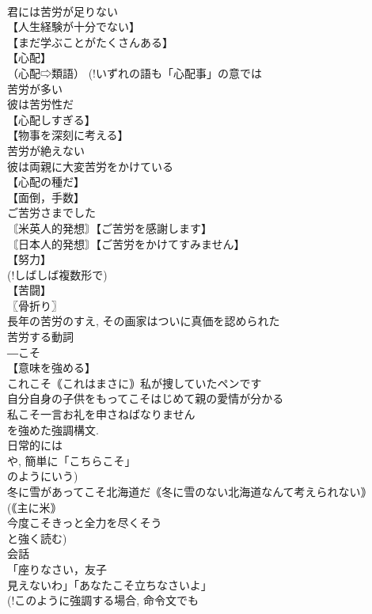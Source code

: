 \documentclass[8pt]{extreport}
\begin{document}
\begin{CJK}{UTF8}{min}
\\	君には苦労が足りない
\\	【人生経験が十分でない】
\\	【まだ学ぶことがたくさんある】
\\	【心配】
\\	（心配⇨類語） (!いずれの語も「心配事」の意では 
\\	苦労が多い
\\	彼は苦労性だ
\\	【心配しすぎる】
\\	【物事を深刻に考える】
\\	苦労が絶えない
\\	彼は両親に大変苦労をかけている
\\	【心配の種だ】
\\	【面倒，手数】
\\	ご苦労さまでした
\\	〘米英人的発想〙【ご苦労を感謝します】
\\	〘日本人的発想〙【ご苦労をかけてすみません】
\\	【努力】
\\	(!しばしば複数形で) 
\\	【苦闘】
\\	〖骨折り〗
\\	長年の苦労のすえ, その画家はついに真価を認められた
\\	苦労する動詞
\\	―こそ
\\	【意味を強める】
\\	これこそ｟これはまさに｠私が捜していたペンです
\\	自分自身の子供をもってこそはじめて親の愛情が分かる
\\	私こそ一言お礼を申さねばなりません
\\	を強めた強調構文. 
\\	日常的には 
\\	や, 簡単に「こちらこそ」
\\	のようにいう)
\\	冬に雪があってこそ北海道だ｟冬に雪のない北海道なんて考えられない｠
\\	(｟主に米｠ 
\\	今度こそきっと全力を尽くそう
\\	と強く読む)
\\	会話
\\	「座りなさい，友子
\\	見えないわ」「あなたこそ立ちなさいよ」
\\	(!このように強調する場合, 命令文でも 

\end{CJK}
\end{document}
